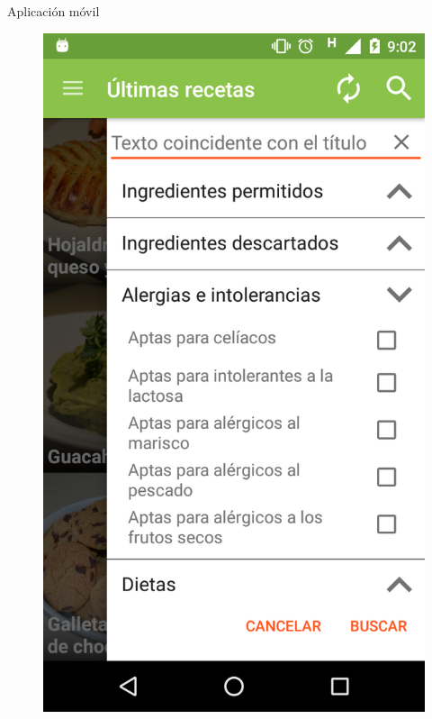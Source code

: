 \documentclass[10pt,xcolor=svgnames]{beamer}
\begin{document}
\begin{frame}{Aplicación móvil}
  \begin{minipage}{\linewidth}
    \centering
    \begin{minipage}{0.4\linewidth}
      \begin{figure}[H]
        \includegraphics[width=\linewidth]{img/captura_06}
      \end{figure}
    \end{minipage}
    \hspace{0.05\linewidth}

\end{minipage}
\end{frame}
\end{document}
